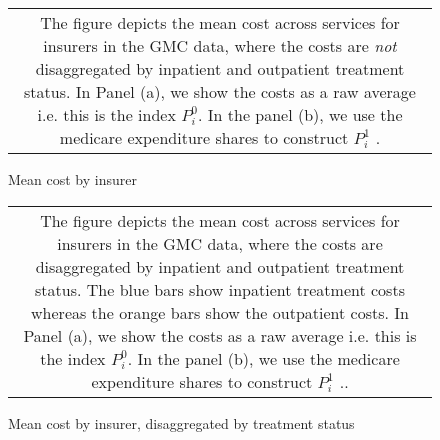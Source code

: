\documentclass{article}
\begin{document}
\begin{figure}
	\centering \caption{Mean cost by insurer\label{fig:meanCost}}
	\subfiguretopcaptrue
	\begin{tabular*}{1.0\textwidth}{c}
		\multicolumn{1}{p{1.0\hsize}}{\footnotesize The figure depicts the mean cost across services for insurers in the GMC data, where the costs are \emph{not} disaggregated by inpatient and outpatient treatment status. In Panel (a), we show the costs as a raw average i.e. this is the index $P^0_i$. In the panel (b), we use the medicare expenditure shares to construct $P^1_i$ . }\\
	\end{tabular*}
\end{figure}



\begin{figure}[h]
	\centering \caption{Mean cost by insurer, disaggregated by treatment status\label{fig:meanCostDisagg}}
	\subfiguretopcaptrue
	\begin{tabular*}{1.0\textwidth}{c}
		\multicolumn{1}{p{1.0\hsize}}{\footnotesize The figure depicts the mean cost across services for insurers in the GMC data, where the costs are disaggregated by inpatient and outpatient treatment status. The blue bars show inpatient treatment costs whereas the orange bars show the outpatient costs. In Panel (a), we show the costs as a raw average i.e. this is the index $P^0_i$. In the panel (b), we use the medicare expenditure shares to construct $P^1_i$ .. }\\
	\end{tabular*}
\end{figure}
\end{document}
